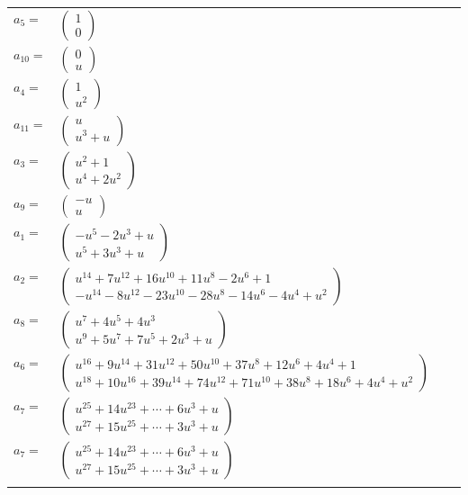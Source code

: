 \documentclass[1p]{elsarticle_modified}
\theoremstyle{definition}
\begin{document}
\begin{tabular}{m{7pt} m{180pt} m{7pt} m{180pt} }
\flushright $a_{5}=$&$\begin{pmatrix}1\\0\end{pmatrix}$ \\
\flushright $a_{10}=$&$\begin{pmatrix}0\\u\end{pmatrix}$ \\
\flushright $a_{4}=$&$\begin{pmatrix}1\\u^2\end{pmatrix}$ \\
\flushright $a_{11}=$&$\begin{pmatrix}u\\u^3+u\end{pmatrix}$ \\
\flushright $a_{3}=$&$\begin{pmatrix}u^2+1\\u^4+2 u^2\end{pmatrix}$ \\
\flushright $a_{9}=$&$\begin{pmatrix}- u\\u\end{pmatrix}$ \\
\flushright $a_{1}=$&$\begin{pmatrix}- u^5-2 u^3+u\\u^5+3 u^3+u\end{pmatrix}$ \\
\flushright $a_{2}=$&$\begin{pmatrix}u^{14}+7 u^{12}+16 u^{10}+11 u^8-2 u^6+1\\- u^{14}-8 u^{12}-23 u^{10}-28 u^8-14 u^6-4 u^4+u^2\end{pmatrix}$ \\
\flushright $a_{8}=$&$\begin{pmatrix}u^7+4 u^5+4 u^3\\u^9+5 u^7+7 u^5+2 u^3+u\end{pmatrix}$ \\
\flushright $a_{6}=$&$\begin{pmatrix}u^{16}+9 u^{14}+31 u^{12}+50 u^{10}+37 u^8+12 u^6+4 u^4+1\\u^{18}+10 u^{16}+39 u^{14}+74 u^{12}+71 u^{10}+38 u^8+18 u^6+4 u^4+u^2\end{pmatrix}$ \\
\flushright $a_{7}=$&$\begin{pmatrix}u^{25}+14 u^{23}+\cdots+6 u^3+u\\u^{27}+15 u^{25}+\cdots+3 u^3+u\end{pmatrix}$\\ \flushright $a_{7}=$&$\begin{pmatrix}u^{25}+14 u^{23}+\cdots+6 u^3+u\\u^{27}+15 u^{25}+\cdots+3 u^3+u\end{pmatrix}$\\&\end{tabular}
\end{document}

